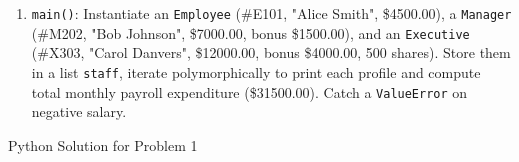 \documentclass[11pt,a4paper]{article}
\begin{document}
\begin{enumerate}[label=\arabic*.,leftmargin=2em,itemsep=1.2pt]
\begin{itemize}
  \item Mutator: \texttt{grant\_shares(self, count)} adds positive integer \texttt{count} to \texttt{\_shares}.
  \item Overrides \texttt{get\_bonus(self)}: Returns \lstinline|super().get_bonus() + self._shares * 5.0| (adds \$5.00 dividend per stock share).
  \item Overrides \texttt{\_\_str\_\_(self)}: Returns \lstinline|f"Executive[#{self._emp_id}, {self._name}]: Shares = {self._shares}, Total = ${self.total_compensation():.2f}"|.
  \end{itemize}
\item \texttt{main()}: Instantiate an \texttt{Employee} (\#E101, "Alice Smith", \$4500.00), a \texttt{Manager} (\#M202, "Bob Johnson", \$7000.00, bonus \$1500.00), and an \texttt{Executive} (\#X303, "Carol Danvers", \$12000.00, bonus \$4000.00, 500 shares). Store them in a list \texttt{staff}, iterate polymorphically to print each profile and compute total monthly payroll expenditure (\$31500.00). Catch a \texttt{ValueError} on negative salary.
\end{enumerate}
\begin{answerbox}[height=8.5cm]{Python Solution for Problem 1}\end{answerbox}
\newpage

\end{document}
